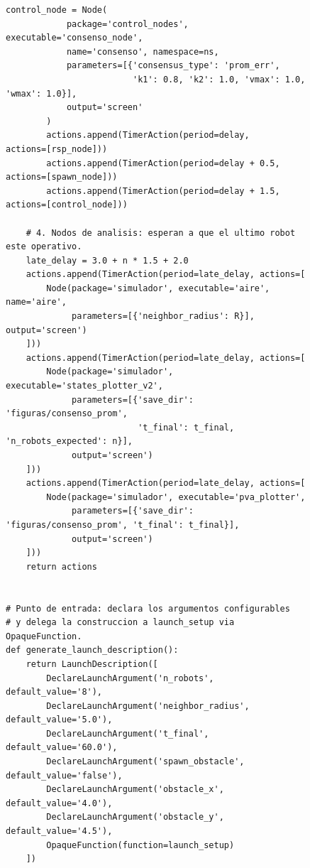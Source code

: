 {\renewcommand{\lstlistingname}{Script}
\begin{figure}[t]
\centering
\begin{lstlisting}[style=python,
    caption={consenso\_prom.launch.py -- Parte 3: timers, nodos tardios y punto de entrada.},
    label={lst:consenso_part3}]
        control_node = Node(
            package='control_nodes', executable='consenso_node',
            name='consenso', namespace=ns,
            parameters=[{'consensus_type': 'prom_err',
                         'k1': 0.8, 'k2': 1.0, 'vmax': 1.0, 'wmax': 1.0}],
            output='screen'
        )
        actions.append(TimerAction(period=delay,       actions=[rsp_node]))
        actions.append(TimerAction(period=delay + 0.5, actions=[spawn_node]))
        actions.append(TimerAction(period=delay + 1.5, actions=[control_node]))

    # 4. Nodos de analisis: esperan a que el ultimo robot este operativo.
    late_delay = 3.0 + n * 1.5 + 2.0
    actions.append(TimerAction(period=late_delay, actions=[
        Node(package='simulador', executable='aire', name='aire',
             parameters=[{'neighbor_radius': R}], output='screen')
    ]))
    actions.append(TimerAction(period=late_delay, actions=[
        Node(package='simulador', executable='states_plotter_v2',
             parameters=[{'save_dir': 'figuras/consenso_prom',
                          't_final': t_final, 'n_robots_expected': n}],
             output='screen')
    ]))
    actions.append(TimerAction(period=late_delay, actions=[
        Node(package='simulador', executable='pva_plotter',
             parameters=[{'save_dir': 'figuras/consenso_prom', 't_final': t_final}],
             output='screen')
    ]))
    return actions


# Punto de entrada: declara los argumentos configurables
# y delega la construccion a launch_setup via OpaqueFunction.
def generate_launch_description():
    return LaunchDescription([
        DeclareLaunchArgument('n_robots',        default_value='8'),
        DeclareLaunchArgument('neighbor_radius', default_value='5.0'),
        DeclareLaunchArgument('t_final',         default_value='60.0'),
        DeclareLaunchArgument('spawn_obstacle',  default_value='false'),
        DeclareLaunchArgument('obstacle_x',      default_value='4.0'),
        DeclareLaunchArgument('obstacle_y',      default_value='4.5'),
        OpaqueFunction(function=launch_setup)
    ])
\end{lstlisting}
\end{figure}
}
